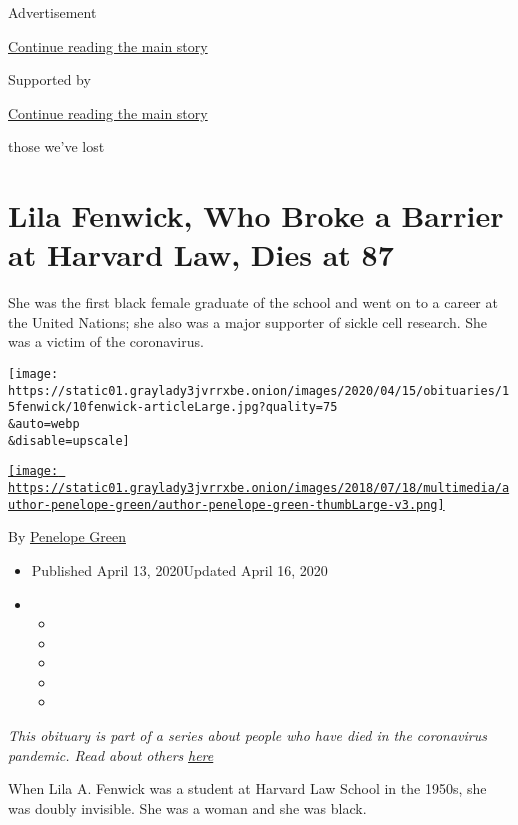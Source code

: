 Advertisement

\protect\hyperlink{after-top}{Continue reading the main story}

Supported by

\protect\hyperlink{after-sponsor}{Continue reading the main story}

those we've lost

\hypertarget{lila-fenwick-who-broke-a-barrier-at-harvard-law-dies-at-87}{%
\section{Lila Fenwick, Who Broke a Barrier at Harvard Law, Dies at
87}\label{lila-fenwick-who-broke-a-barrier-at-harvard-law-dies-at-87}}

She was the first black female graduate of the school and went on to a
career at the United Nations; she also was a major supporter of sickle
cell research. She was a victim of the coronavirus.

\texttt{[image: https://static01.graylady3jvrrxbe.onion/images/2020/04/15/obituaries/15fenwick/10fenwick-articleLarge.jpg?quality=75\\\&auto=webp\\\&disable=upscale]}

\href{https://www.nytimes3xbfgragh.onion/by/penelope-green}{\texttt{[image: https://static01.graylady3jvrrxbe.onion/images/2018/07/18/multimedia/author-penelope-green/author-penelope-green-thumbLarge-v3.png]}}

By \href{https://www.nytimes3xbfgragh.onion/by/penelope-green}{Penelope
Green}

\begin{itemize}
\item
  Published April 13, 2020Updated April 16, 2020
\item
  \begin{itemize}
  \item
  \item
  \item
  \item
  \item
  \end{itemize}
\end{itemize}

\emph{This obituary is part of a series about people who have died in
the coronavirus pandemic. Read about others}
\href{https://www.nytimes3xbfgragh.onion/series/people-who-have-died-of-the-coronavirus}{\emph{here}}

When Lila A. Fenwick was a student at Harvard Law School in the 1950s,
she was doubly invisible. She was a woman and she was black.

